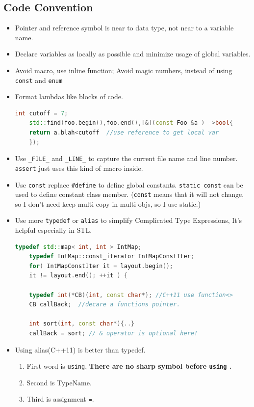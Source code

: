 \documentclass[a4paper,11pt,twoside]{book}
\begin{document}
\subsection{Code Convention}
\begin{itemize}
	
	\item Pointer and reference symbol is near to data type, not near to a variable name.
	
	
	\item Declare variables as locally as possible and minimize usage of global variables.
	
	\item Avoid macro, use inline function;  Avoid magic numbers, instead of using \texttt{const} and \texttt{enum}
	
	\item Format lambdas like blocks of code.
	\begin{lstlisting}[frame=single, language=c++]
	int cutoff = 7;
	std::find(foo.begin(),foo.end(),[&](const Foo &a ) ->bool{
	return a.blah<cutoff  //use reference to get local var
	});
	\end{lstlisting}
	
	
	\item Use \texttt{\_FILE\_} and \texttt{\_LINE\_} to capture the current file name and line number.  \texttt{assert} just uses this kind of macro inside.
	
	\item Use \texttt{const} replace \texttt{\#define} to define global constants. \texttt{static const} can be used to define constant class member. (\texttt{const} means that it will not change, so I don't need keep multi copy in multi objs, so I use static.)
	
	\item Use more \texttt{typedef} or \texttt{alias} to simplify Complicated Type Expressions, It's helpful especially in STL. 
	\begin{lstlisting}[frame=single, language=c++]
	typedef std::map< int, int > IntMap;
	typedef IntMap::const_iterator IntMapConstIter;
	for( IntMapConstIter it = layout.begin();
	it != layout.end(); ++it ) {
	
	typedef int(*CB)(int, const char*); //C++11 use function<>
	CB callBack;  //decare a functions pointer.
	
	int sort(int, const char*){..}
	callBack = sort; // & operator is optional here!
	\end{lstlisting}
	
	\item Using alias(C++11) is better than typedef. 
	\begin{enumerate}
		\item First word is \texttt{using}, \textbf{There are no sharp symbol before \texttt{using} .} 
		\item Second is TypeName. 
		\item Third is assignment \texttt{=}.  
	\end{enumerate}
	

\end{itemize}
\end{document}
